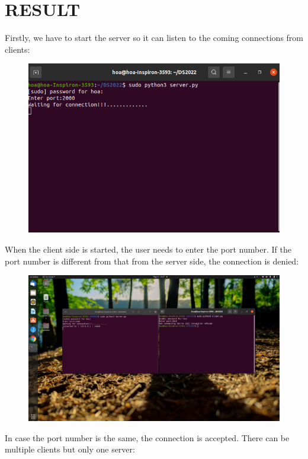 \newpage
\vspace{6cm}
\section{RESULT}
\hspace{0.7cm}Firstly, we have to start the server so it can listen to the coming connections from clients:
\begin{figure}[h]
\centering
\includegraphics{images/result_1.png}
\end{figure}

\hspace{0.7cm}When the client side is started, the user needs to enter the port number. If the port number is different from that from the server side, the connection is denied:

\begin{figure}[h]
\centering
\includegraphics{images/result_2.png}
\end{figure}
\newpage
\hspace{0.7cm} In case the port number is the same, the connection is accepted. There can be multiple clients but only one server:

